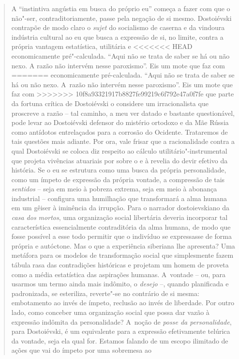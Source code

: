 {\begin{quote}
A ``instintiva angústia em busca do próprio eu'' começa a fazer com que
o não"-ser, contraditoriamente, passe pela negação de si mesmo.
Dostoiévski contrapõe de modo claro o \emph{sujet} do socialismo de
caserna e da vindoura indústria cultural ao eu que busca a expressão de
si, no limite, contra a própria vantagem estatística, utilitária e
<<<<<<< HEAD
economicamente pré"-calculada. ``Aqui não se trata de saber se há ou não
nexo. A razão não intervém nesse paroxismo''. Eis um mote que faz com
=======
economicamente pré-calculada. ``Aqui não se trata de saber se há ou não
nexo. A~razão não intervém nesse paroxismo''. Eis um mote que faz com
>>>>>>> 10f8a93321917b8827fe99219c6f792e47a0f7fe
que parte da fortuna crítica de Dostoiévski o considere um
irracionalista que proscreve a razão -- tal caminho, a meu ver datado e
bastante questionável, pode levar ao Dostoiévski defensor do mistério
ortodoxo e da Mãe Rússia como antídotos entrelaçados para a corrosão do
Ocidente. Trataremos de tais questões mais adiante. Por ora, vale frisar
que a racionalidade contra a qual Dostoiévski se coloca diz respeito ao
cálculo utilitário"-instrumental que projeta vivências atuariais por
sobre o e à revelia do devir efetivo da história. Se o eu se estrutura
como uma busca da própria personalidade, como um ímpeto de expressão da
própria vontade, a compressão de tais \emph{sentidos} -- seja em meio à
pobreza extrema, seja em meio à abonança industrial -- configura uma
humilhação que transformará a alma humana em um gêiser à iminência da
irrupção. Para o narrador dostoievskiano da \emph{casa dos mortos}, uma
organização social libertária deveria incorporar tal característica
essencialmente contraditória da alma humana, de modo que fosse possível
a esse todo permitir que o indivíduo se expressasse de forma própria e
autóctone. Mas o que a experiência siberiana lhe apresenta? Uma metáfora
para os modelos de transformação social que simplesmente fazem tábula
rasa das contradições históricas e projetam um homem de proveta como a
média estatística das aspirações humanas. A~vontade -- ou, para usarmos
um termo ainda mais indômito, o \emph{desejo} --, quando planificada e
padronizada, se esteriliza, reverte"-se no contrário de si mesma:
embotamento ao invés de ímpeto, reclusão ao invés de liberdade. Por
outro lado, como conceber uma organização social que possa dar vazão à
expressão indômita da personalidade? A~noção de \emph{posse da
personalidade}, para Dostoiévski, é um equivalente para a expressão
efetivamente telúrica da vontade, seja ela qual for. Estamos falando de
um escopo ilimitado de ações que vai do ímpeto por uma sobremesa ao

\end{quote}}
